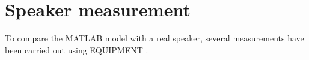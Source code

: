 \chapter{Speaker measurement}
To compare the MATLAB model with a real speaker, several measurements have been carried out using EQUIPMENT .


%


